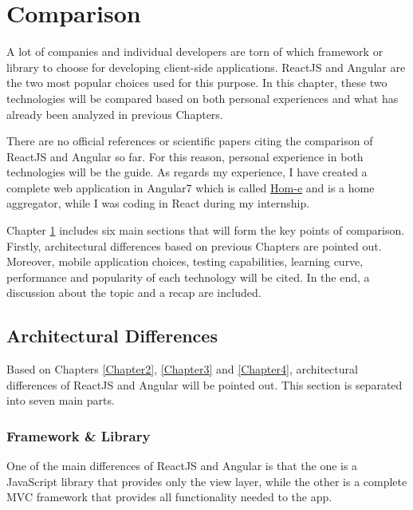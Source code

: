 
\chapter{Comparison} %
\label{Chapter5} %

A lot of companies and individual developers are torn of which framework or library to choose for developing client-side applications. ReactJS and Angular are the two most popular choices used for this purpose. In this chapter, these two technologies will be compared based on both personal experiences and what has already been analyzed in previous Chapters. \par

There are no official references or scientific papers citing the comparison of ReactJS and Angular so far. For this reason, personal experience in both technologies will be the guide. As regards my experience, I have created a complete web application in Angular7 which is called \href{https://snf-844240.vm.okeanos.grnet.gr/#/index}{Hom-e} and is a home aggregator, while I was coding in React during my internship. \par

Chapter \ref{Chapter5} includes six main sections that will form the key points of comparison. Firstly, architectural differences based on previous Chapters are pointed out. Moreover, mobile application choices, testing capabilities, learning curve, performance and popularity of each technology will be cited. In the end, a discussion about the topic and a recap are included. \par

\section{Architectural Differences}

Based on Chapters \ref{Chapter2}, \ref{Chapter3} and \ref{Chapter4}, architectural differences of ReactJS and Angular will be pointed out. This section is separated into seven main parts. \par

\subsection{Framework \& Library}

One of the main differences of ReactJS and Angular is that the one is a JavaScript library that provides only the view layer, while the other is a complete MVC framework that provides all functionality needed to the app. \par

